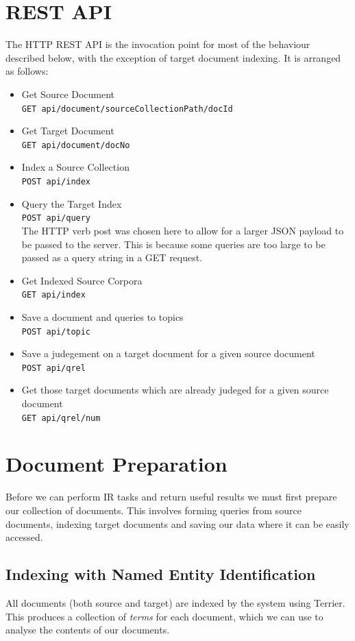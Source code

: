\documentclass{l4proj}
\newcommand{\code}[1]{\texttt{#1}}
\begin{document}
\section{REST API}
The HTTP REST API is the invocation point for most of the behaviour described below, with the exception of target document indexing. It is arranged as follows:
\begin{itemize}
\item Get Source Document \\
\code{GET api/document/{sourceCollectionPath}/{docId}}
\item Get Target Document \\
\code{GET api/document/{docNo}}
\item Index a Source Collection \\
\code{POST api/index}
\item Query the Target Index \\
\code{POST api/query} \\
The HTTP verb post was chosen here to allow for a larger JSON payload to be passed to the server. This is because some queries are too large to be passed as a query string in a GET request.
\item Get Indexed Source Corpora \\
\code{GET api/index}
\item Save a document and queries to topics \\
\code{POST api/topic}
\item Save a judegement on a target document for a given source document \\
\code{POST api/qrel}
\item Get those target documents which are already judeged for a given source document \\
\code{GET api/qrel/{num}}
\end{itemize}

\section{Document Preparation}
Before we can perform IR tasks and return useful results we must first prepare our collection of documents. This involves forming queries from source documents, indexing target documents and saving our data where it can be easily accessed.

\subsection{Indexing with Named Entity Identification} \label{nertok}
All documents (both source and target) are indexed by the system using Terrier. This produces a collection of \textit{terms} for each document, which we can use to analyse the contents of our documents.
\end{document}
